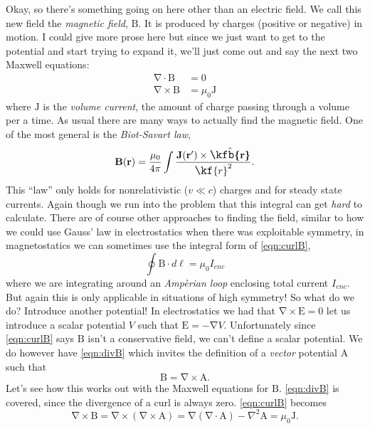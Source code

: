 \documentclass[10pt, twocolumn]{article}
\theoremstyle{definition}
\newcommand{\bv}[1]{\bm{\mathrm{#1}}}
\newcommand{\uv}[1]{\hat{\bv{{#1}}}}
\newcommand{\scriptr}{\fontsize{12pt}{12pt}\kf{r}\fontsize{10pt}{10pt}}
\newcommand{\bscriptr}{\fontsize{12pt}{12pt}\kfb{r}\fontsize{10pt}{10pt}}
\begin{document}
Okay, so there's something going on here other than an electric field. We call this new field the \emph{magnetic field}, $\bv{B}$. It is produced
by charges (positive or negative) in motion. I could give more prose here but since we just want to get to the potential and start trying to expand
it, we'll just come out and say the next two Maxwell equations:
\begin{align}
  \bv{\nabla}\cdot\bv{B}  & =0 \label{eqn:divB} \\
  \bv{\nabla}\times\bv{B} & =\mu_0\bv{J}
  \label{eqn:curlB}
\end{align}
where $\bv{J}$ is the \emph{volume current}, the amount of charge passing through a volume per a time. As usual there are many ways to actually
find the magnetic field. One of the most general is the \emph{Biot-Savart law},
\begin{equation}
  \bv{B}(\bv{r})=\frac{\mu_0}{4\pi}\int \frac{\bv{J}(\bv{r}')\times \uv{\bscriptr}}{\scriptr^2}.
  \label{eqn:biot-savart}
\end{equation}
This ``law'' only holds for nonrelativistic ($v\ll c$) charges and for steady state currents. Again though we run into the problem
that this integral can get \emph{hard} to calculate. There are of course other approaches to finding the field, similar to how we could use
Gauss' law in electrostatics when there was exploitable symmetry, in magnetostatics we can sometimes use the integral form of \cref{eqn:curlB},
\begin{equation}
  \oint \bv{B}\cdot d\bv{\ell}=\mu_0 I_{enc}
  \label{eqn:amperes-law}
\end{equation}
where we are integrating around an \emph{Amp\`erian loop} enclosing total current $I_{enc}$. But again this is only applicable in situations
of high symmetry! So what do we do? Introduce another potential! In electrostatics we had that $\bv{\nabla}\times\bv{E}=0$ let us introduce a
scalar potential $V$ such that $\bv{E}=-\bv{\nabla}V$. Unfortunately since \cref{eqn:curlB} says $\bv{B}$ isn't a conservative field,
we can't define a scalar potential. We do however have \cref{eqn:divB} which invites the definition of a \emph{vector} potential $\bv{A}$ such
that
\begin{equation}
  \bv{B}=\bv{\nabla}\times \bv{A}.
  \label{eqn:vec-pot}
\end{equation}
Let's see how this works out with the Maxwell equations for $\bv{B}$. \cref{eqn:divB} is covered, since the divergence of a curl is always zero.
\cref{eqn:curlB} becomes
$$\bv{\nabla}\times\bv{B}=\bv{\nabla}\times(\bv{\nabla}\times \bv{A})=\bv{\nabla}(\bv{\nabla}\cdot \bv{A})-\nabla^2\bv{A}=\mu_0\bv{J}.$$
\end{document}
